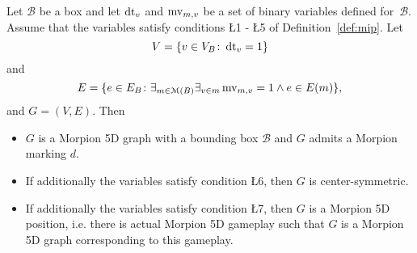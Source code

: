 \begin{lemma}
\label{lem:solutions}
  Let ${\mathcal B}$ be a box and let $\operatorname{dt}_v$ and $\operatorname{mv}_{m, v}$ be a set of binary variables defined for~$\mathcal{B}$. Assume that the variables satisfy conditions \L{1} - \L{5} of Definition~\ref{def:mip}.
  Let
 \[
    V = \{ v \in V_B \colon \operatorname{dt}_v = 1 \}
\]
 and
 \[
    E = \{ e \in E_B \colon \exists_{m \in \mathcal{M}(B)} \exists_{v \in m} \operatorname{mv}_{m, v} = 1 \wedge e  \in E(m) \},
  \]
  and $G = (V, E)$. Then
 \begin{itemize}
\item $G$ is a Morpion 5D graph with a bounding box $\mathcal{B}$ and $G$ admits a Morpion marking $d$.
\item If additionally the variables satisfy condition \L{6}, then $G$ is center-symmetric. 
\item If additionally the variables satisfy condition \L{7}, then $G$ is a Morpion 5D position, i.e. there is actual Morpion 5D gameplay such that $G$ is a Morpion 5D graph corresponding to this gameplay.
\end{itemize}
\end{lemma}
